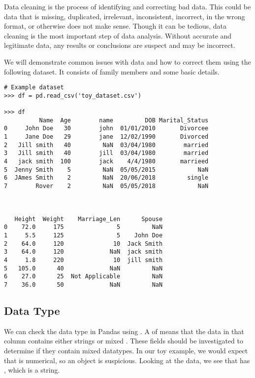 
Data cleaning is the process of identifying and correcting bad data.
This could be data that is missing, duplicated, irrelevant, inconsistent, incorrect, in the wrong format, or otherwise does not make sense.
Though it can be tedious, data cleaning is the most important step of data analysis.
Without accurate and legitimate data, any results or conclusions are suspect and may be incorrect.

We will demonstrate common issues with data and how to correct them using the following dataset.
It consists of family members and some basic details.

\begin{lstlisting}
# Example dataset
>>> df = pd.read_csv('toy_dataset.csv')

>>> df
          Name  Age        name         DOB Marital_Status
0     John Doe   30        john  01/01/2010       Divorcee
1     Jane Doe   29    	   jane	 12/02/1990       Divorced
2   Jill smith   40         NaN  03/04/1980        married
3   Jill smith   40  	   jill  03/04/1980        married
4   jack smith  100        jack    4/4/1980       marrieed
5  Jenny Smith    5         NaN  05/05/2015            NaN
6  JAmes Smith    2         NaN  20/06/2018         single
7        Rover    2         NaN  05/05/2018            NaN



   Height  Weight    Marriage_Len      Spouse
0    72.0     175               5         NaN
1     5.5     125               5    John Doe
2    64.0     120              10  Jack Smith
3    64.0     120             NaN  jack smith
4     1.8     220              10  jill smith
5   105.0      40             NaN         NaN
6    27.0      25  Not Applicable         NaN
7    36.0      50             NaN         NaN

\end{lstlisting}



\subsection*{Data Type}

We can check the data type in Pandas using .
A  of  means that the data in that column contains either strings or mixed .
These fields should be investigated to determine if they contain mixed datatypes.
In our toy example, we would expect that  is numerical, so an object  is suspicious.
Looking at the data, we see that  has , which is a string.


